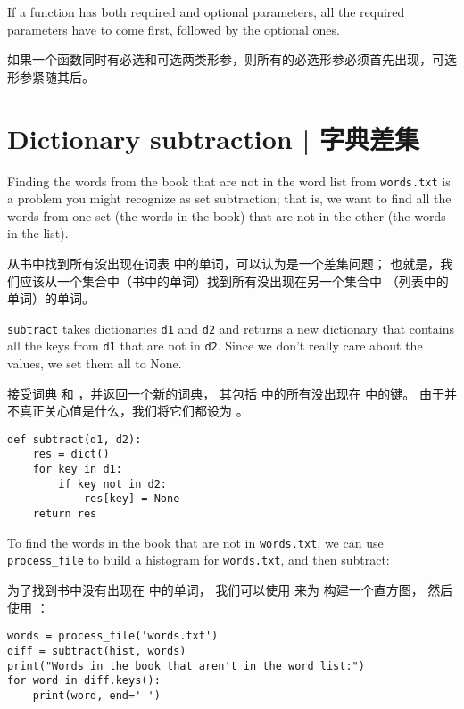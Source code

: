 
If a function has both required and optional parameters, all
the required parameters have to come first, followed by the
optional ones.

如果一个函数同时有必选和可选两类形参，则所有的必选形参必须首先出现，可选形参紧随其后。

\section{Dictionary subtraction  |  字典差集}

\label{dictsub}

Finding the words from the book that are not in the word list
from {\tt words.txt} is a problem you might recognize as set
subtraction; that is, we want to find all the words from one
set (the words in the book) that are not in the other (the
words in the list).

从书中找到所有没出现在词表  中的单词，可以认为是一个差集问题；
也就是，我们应该从一个集合中（书中的单词）找到所有没出现在另一个集合中
（列表中的单词）的单词。

{\tt subtract} takes dictionaries {\tt d1} and {\tt d2} and returns a
new dictionary that contains all the keys from {\tt d1} that are not
in {\tt d2}.  Since we don't really care about the values, we
set them all to None.

 接受词典  和  ，并返回一个新的词典，
其包括  中的所有没出现在  中的键。
由于并不真正关心值是什么，我们将它们都设为 。

\begin{lstlisting}
def subtract(d1, d2):
    res = dict()
    for key in d1:
        if key not in d2:
            res[key] = None
    return res
\end{lstlisting}

%
To find the words in the book that are not in {\tt words.txt},
we can use \verb"process_file" to build a histogram for
{\tt words.txt}, and then subtract:

为了找到书中没有出现在  中的单词，
我们可以使用  来为  构建一个直方图，
然后使用  ：

\begin{lstlisting}
words = process_file('words.txt')
diff = subtract(hist, words)
print("Words in the book that aren't in the word list:")
for word in diff.keys():
    print(word, end=' ')
\end{lstlisting}

